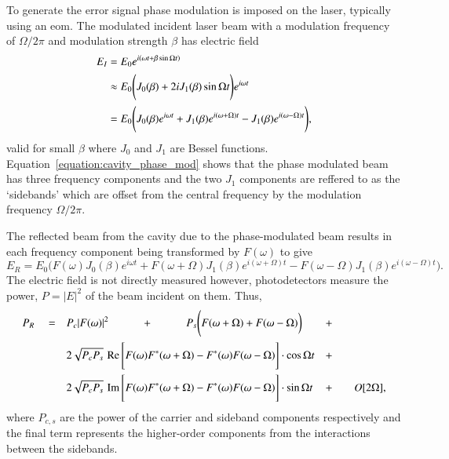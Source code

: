 To generate the error signal phase modulation is imposed on the laser, typically using an \gls{eom}.
The modulated incident laser beam with a modulation frequency of $\Omega/2\pi$ and modulation strength $\beta$ has electric field
\begin{align}
E_I &= E_0 e^{i\left(\omega t + \beta \sin\Omega t \right)} \notag \\
&\approx E_0 \Bigg( J_0(\beta) + 2iJ_1(\beta)\sin\Omega t \Bigg)e^{i\omega t} \notag \\
&= E_0 \Bigg( J_0(\beta)e^{i\omega t} + J_1(\beta)e^{i(\omega + \Omega)t} - J_1(\beta)e^{i(\omega - \Omega)t} \Bigg),\label{equation:cavity_phase_mod}
\end{align}
valid for small $\beta$ where $J_0$ and $J_1$ are Bessel functions.
Equation~\ref{equation:cavity_phase_mod} shows that the phase modulated beam has three frequency components and the two $J_1$ components are reffered to as the `sidebands' which are offset from the central frequency by the modulation frequency $\Omega/2\pi$.

The reflected beam from the cavity due to the phase-modulated beam results in each frequency component being transformed by $F(\omega)$ to give
\begin{equation}
E_R = E_0 \Bigg(F(\omega)J_0(\beta)e^{i\omega t} + F(\omega+\Omega)J_1(\beta)e^{i(\omega+\Omega) t} - F(\omega-\Omega)J_1(\beta)e^{i(\omega-\Omega) t} \Bigg).
\end{equation}
The electric field is not directly measured however, photodetectors measure the power, $P=|E|^2$ of the beam incident on them.
Thus,
\begin{align}
P_R \quad= \quad&P_c|F(\omega)|^2 \quad\qquad+\quad\qquad P_s \Bigg( F(\omega+\Omega) + F(\omega-\Omega)\bigg) &+\qquad&\notag\\
& 2\sqrt{P_cP_s} \, \operatorname{Re}\Bigg[ F(\omega)F^*(\omega+\Omega)-F^*(\omega)F(\omega-\Omega)\Bigg]\cdot\cos\Omega t &+\qquad& \notag\\
& 2\sqrt{P_cP_s} \, \operatorname{Im}\Bigg[ F(\omega)F^*(\omega+\Omega)-F^*(\omega)F(\omega-\Omega)\Bigg]\cdot\sin\Omega t &+ \qquad&O[2\Omega],
\end{align}
where $P_{c,s}$ are the power of the carrier and sideband components respectively and the final term represents the higher-order components from the interactions between the sidebands.

